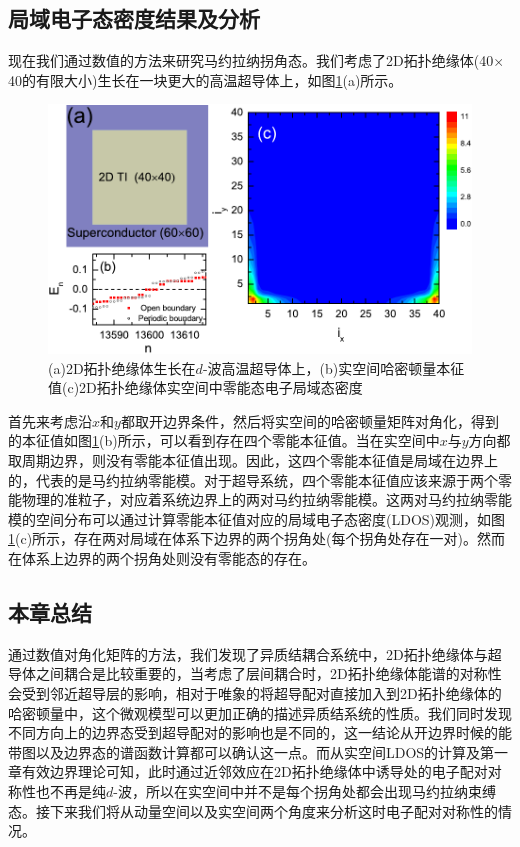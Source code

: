 \subsection{局域电子态密度结果及分析}
 现在我们通过数值的方法来研究马约拉纳拐角态。我们考虑了2D拓扑绝缘体(40$\times$40的有限大小)生长在一块更大的高温超导体上，如图\ref{fig18}(a)所示。
\begin{figure}[h]
\centering
\includegraphics[scale=0.8]{pic/fig19}
\caption{(a)2D拓扑绝缘体生长在$d$-波高温超导体上，(b)实空间哈密顿量本征值(c)2D拓扑绝缘体实空间中零能态电子局域态密度}\label{fig18}
\end{figure}
首先来考虑沿$x$和$y$都取开边界条件，然后将实空间的哈密顿量矩阵对角化，得到的本征值如图\ref{fig18}(b)所示，可以看到存在四个零能本征值。当在实空间中$x$与$y$方向都取周期边界，则没有零能本征值出现。因此，这四个零能本征值是局域在边界上的，代表的是马约拉纳零能模。对于超导系统，四个零能本征值应该来源于两个零能物理的准粒子，对应着系统边界上的两对马约拉纳零能模。这两对马约拉纳零能模的空间分布可以通过计算零能本征值对应的局域电子态密度(LDOS)观测，如图\ref{fig18}(c)所示，存在两对局域在体系下边界的两个拐角处(每个拐角处存在一对)。然而在体系上边界的两个拐角处则没有零能态的存在。
\subsection{本章总结}
 通过数值对角化矩阵的方法，我们发现了异质结耦合系统中，2D拓扑绝缘体与超导体之间耦合是比较重要的，当考虑了层间耦合时，2D拓扑绝缘体能谱的对称性会受到邻近超导层的影响，相对于唯象的将超导配对直接加入到2D拓扑绝缘体的哈密顿量中，这个微观模型可以更加正确的描述异质结系统的性质。我们同时发现不同方向上的边界态受到超导配对的影响也是不同的，这一结论从开边界时候的能带图以及边界态的谱函数计算都可以确认这一点。而从实空间LDOS的计算及第一章有效边界理论可知，此时通过近邻效应在2D拓扑绝缘体中诱导处的电子配对对称性也不再是纯$d$-波，所以在实空间中并不是每个拐角处都会出现马约拉纳束缚态。接下来我们将从动量空间以及实空间两个角度来分析这时电子配对对称性的情况。








